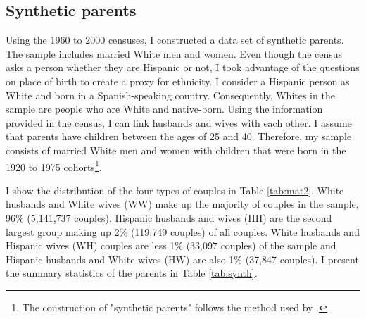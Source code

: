 \documentclass[12pt,english]{article}
\begin{document}

 
\subsection{Synthetic parents}

Using the 1960 to 2000 censuses, I constructed a data set of synthetic parents. The sample includes married White men and women. Even though the census asks a person whether they are Hispanic or not, I took advantage of the questions on place of birth to create a proxy for ethnicity. I consider a Hispanic person as White and born in a Spanish-speaking country. Consequently, Whites in the sample are people who are White and native-born. Using the information provided in the census, I can link husbands and wives with each other. I assume that parents have children between the ages of 25 and 40. Therefore, my sample consists of married White men and women with children that were born in the 1920 to 1975 cohorts\footnote{The construction of "synthetic parents" follows the method used by \textcite{rubinstein2014pride}.}.

I show the distribution of the four types of couples in Table \ref{tab:mat2}. White husbands and White wives (WW) make up the majority of couples in the sample, 96\% (5,141,737 couples). Hispanic husbands and wives (HH) are the second largest group making up 2\% (119,749 couples) of all couples. White husbands and Hispanic wives (WH) couples are less 1\% (33,097 couples) of the sample and Hispanic husbands and White wives (HW) are also 1\% (37,847 couples). I present the summary statistics of the parents in Table \ref{tab:synth}.
\end{document}

